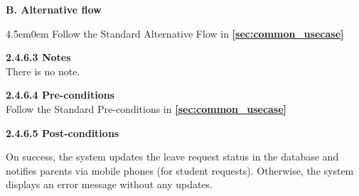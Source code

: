 \par\indent\indent\textbf{B. Alternative flow}
\begin{adjustwidth}{4.5em}{0em}
    Follow the Standard Alternative Flow in \textbf{\autoref{sec:common_usecase} }
\end{adjustwidth}
\vspace{0.5em}

\indent\textbf{2.4.6.3 Notes}\\
\indent\indent There is no note.
\vspace{0.5em}

\indent\textbf{2.4.6.4 Pre-conditions}\\
\indent\indent Follow the Standard Pre-conditions in \textbf{\autoref{sec:common_usecase}}

\vspace{0.5em}
\indent\textbf{2.4.6.5 Post-conditions}\\
\vspace{-0.7em}
\par\indent\indent\parbox{0.9\textwidth}{
    On success, the system updates the leave request status in the database and notifies parents via mobile phones (for student requests). Otherwise, the system displays an error message without any updates.
}\\


